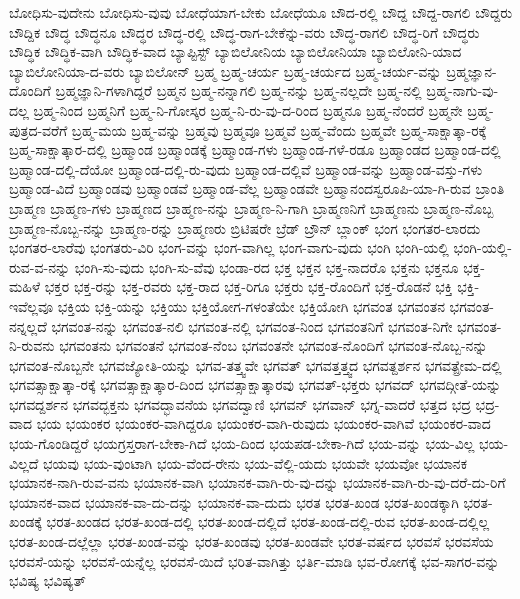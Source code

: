 {ಬೋಧಿಸು-ವುದೇನು
ಬೋಧಿಸು-ವುವು
ಬೋಧೆಯಾಗ-ಬೇಕು
ಬೋಧೆಯೂ
ಬೌದ-ರಲ್ಲಿ
ಬೌದ್ದ
ಬೌದ್ದ-ರಾಗಲಿ
ಬೌದ್ದರು
ಬೌದ್ದಿಕ
ಬೌದ್ಧ
ಬೌದ್ಧನೂ
ಬೌದ್ಧರ
ಬೌದ್ಧ-ರಲ್ಲಿ
ಬೌದ್ಧ-ರಾಗ-ಬೇಕೆನ್ನು-ವರು
ಬೌದ್ಧ-ರಾಗಲಿ
ಬೌದ್ಧ-ರಿಗೆ
ಬೌದ್ಧರು
ಬೌದ್ಧಿಕ
ಬೌದ್ಧಿಕ-ವಾಗಿ
ಬೌದ್ಧಿಕ-ವಾದ
ಬ್ಯಾಪ್ಟಿಸ್ಟ್
ಬ್ಯಾಬಿಲೋನಿಯ
ಬ್ಯಾಬಿಲೋನಿಯಾ
ಬ್ಯಾಬಿಲೋನಿ-ಯಾದ
ಬ್ಯಾಬಿಲೋನಿಯಾ-ದ-ವರು
ಬ್ಯಾಬಿಲೋನ್
ಬ್ರಹ್ಮ
ಬ್ರಹ್ಮ-ಚರ್ಯ
ಬ್ರಹ್ಮ-ಚರ್ಯದ
ಬ್ರಹ್ಮ-ಚರ್ಯ-ವನ್ನು
ಬ್ರಹ್ಮಜ್ಞಾನ-ದೊಂದಿಗೆ
ಬ್ರಹ್ಮಜ್ಞಾನಿ-ಗಳಾಗಿದ್ದರೆ
ಬ್ರಹ್ಮನ
ಬ್ರಹ್ಮ-ನನ್ನಾಗಲಿ
ಬ್ರಹ್ಮ-ನನ್ನು
ಬ್ರಹ್ಮ-ನಲ್ಲದೇ
ಬ್ರಹ್ಮ-ನಲ್ಲಿ
ಬ್ರಹ್ಮ-ನಾಗು-ವು-ದಲ್ಲ
ಬ್ರಹ್ಮ-ನಿಂದ
ಬ್ರಹ್ಮನಿಗೆ
ಬ್ರಹ್ಮ-ನಿ-ಗೋಸ್ಕರ
ಬ್ರಹ್ಮ-ನಿ-ರು-ವು-ದ-ರಿಂದ
ಬ್ರಹ್ಮನೂ
ಬ್ರಹ್ಮ-ನೆಂದರೆ
ಬ್ರಹ್ಮನೇ
ಬ್ರಹ್ಮ-ಪುತ್ರದ-ವರೆಗೆ
ಬ್ರಹ್ಮ-ಮಯ
ಬ್ರಹ್ಮ-ವನ್ನು
ಬ್ರಹ್ಮವು
ಬ್ರಹ್ಮವೂ
ಬ್ರಹ್ಮವೆ
ಬ್ರಹ್ಮ-ವೆಂದು
ಬ್ರಹ್ಮವೇ
ಬ್ರಹ್ಮ-ಸಾಕ್ಷಾತ್ಕಾ-ರಕ್ಕೆ
ಬ್ರಹ್ಮ-ಸಾಕ್ಷಾತ್ಕಾರ-ದಲ್ಲಿ
ಬ್ರಹ್ಮಾಂಡ
ಬ್ರಹ್ಮಾಂಡಕ್ಕೆ
ಬ್ರಹ್ಮಾಂಡ-ಗಳು
ಬ್ರಹ್ಮಾಂಡ-ಗಳೆ-ರಡೂ
ಬ್ರಹ್ಮಾಂಡದ
ಬ್ರಹ್ಮಾಂಡ-ದಲ್ಲಿ
ಬ್ರಹ್ಮಾಂಡ-ದಲ್ಲಿ-ದೆಯೋ
ಬ್ರಹ್ಮಾಂಡ-ದಲ್ಲಿ-ರು-ವುದು
ಬ್ರಹ್ಮಾಂಡ-ದಲ್ಲಿವೆ
ಬ್ರಹ್ಮಾಂಡ-ವನ್ನು
ಬ್ರಹ್ಮಾಂಡ-ವಸ್ತು-ಗಳು
ಬ್ರಹ್ಮಾಂಡ-ವಿದೆ
ಬ್ರಹ್ಮಾಂಡವು
ಬ್ರಹ್ಮಾಂಡವೆ
ಬ್ರಹ್ಮಾಂಡ-ವೆಲ್ಲ
ಬ್ರಹ್ಮಾಂಡವೇ
ಬ್ರಹ್ಮಾನಂದಸ್ವರೂಪಿ-ಯಾ-ಗಿ-ರುವ
ಬ್ರಾಂತಿ
ಬ್ರಾಹ್ಮಣ
ಬ್ರಾಹ್ಮಣ-ಗಳು
ಬ್ರಾಹ್ಮಣದ
ಬ್ರಾಹ್ಮಣ-ನನ್ನು
ಬ್ರಾಹ್ಮಣ-ನಿ-ಗಾಗಿ
ಬ್ರಾಹ್ಮಣನಿಗೆ
ಬ್ರಾಹ್ಮಣನು
ಬ್ರಾಹ್ಮಣ-ನೊಬ್ಬ
ಬ್ರಾಹ್ಮಣ-ನೊಬ್ಬ-ನನ್ನು
ಬ್ರಾಹ್ಮಣ-ರನ್ನು
ಬ್ರಾಹ್ಮಣರು
ಬ್ರಿಟಿಷರೇ
ಬ್ರೆಡ್
ಬ್ರೌನ್
ಬ್ಲಾಂಕ್
ಭಂಗ
ಭಂಗತರ-ಲಾರದು
ಭಂಗತರ-ಲಾರೆವು
ಭಂಗತರು-ವಿರಿ
ಭಂಗ-ವನ್ನು
ಭಂಗ-ವಾಗಿಲ್ಲ
ಭಂಗ-ವಾಗು-ವುದು
ಭಂಗಿ
ಭಂಗಿ-ಯಲ್ಲಿ
ಭಂಗಿ-ಯಲ್ಲಿ-ರುವ-ವ-ನನ್ನು
ಭಂಗಿ-ಸು-ವುದು
ಭಂಗಿ-ಸು-ವೆವು
ಭಂಡಾ-ರದ
ಭಕ್ತ
ಭಕ್ತನ
ಭಕ್ತ-ನಾದರೊ
ಭಕ್ತನು
ಭಕ್ತನೂ
ಭಕ್ತ-ಮಹಿಳೆ
ಭಕ್ತರ
ಭಕ್ತ-ರನ್ನು
ಭಕ್ತ-ರವರು
ಭಕ್ತ-ರಾದ
ಭಕ್ತ-ರಿಗೂ
ಭಕ್ತರು
ಭಕ್ತ-ರೊಂದಿಗೆ
ಭಕ್ತ-ರೊಡನೆ
ಭಕ್ತಿ
ಭಕ್ತಿ-ಇವೆಲ್ಲವೂ
ಭಕ್ತಿಯ
ಭಕ್ತಿ-ಯನ್ನು
ಭಕ್ತಿಯು
ಭಕ್ತಿಯೋಗ-ಗಳಂತೆಯೇ
ಭಕ್ತಿಯೋಗಿ
ಭಗವಂತ
ಭಗವಂತನ
ಭಗವಂತ-ನನ್ನಲ್ಲದೆ
ಭಗವಂತ-ನನ್ನು
ಭಗವಂತ-ನಲಿ
ಭಗವಂತ-ನಲ್ಲಿ
ಭಗವಂತ-ನಿಂದ
ಭಗವಂತನಿಗೆ
ಭಗವಂತ-ನಿಗೇ
ಭಗವಂತ-ನಿ-ರುವನು
ಭಗವಂತನು
ಭಗವಂತನೆ
ಭಗವಂತ-ನೆಂಬ
ಭಗವಂತನೇ
ಭಗವಂತ-ನೊಂದಿಗೆ
ಭಗವಂತ-ನೊಬ್ಬ-ನನ್ನು
ಭಗವಂತ-ನೊಬ್ಬನೇ
ಭಗವಜ್ಯೋತಿ-ಯನ್ನು
ಭಗವ-ತತ್ತ್ವವೇ
ಭಗವತ್
ಭಗವತ್ತತ್ತ್ವದ
ಭಗವತ್ದರ್ಶನ
ಭಗವತ್ಪ್ರೇಮ-ದಲ್ಲಿ
ಭಗವತ್ಸಾಕ್ಷಾತ್ಕಾ-ರಕ್ಕೆ
ಭಗವತ್ಸಾಕ್ಷಾತ್ಕಾರ-ದಿಂದ
ಭಗವತ್ಸಾಕ್ಷಾತ್ಕಾರವು
ಭಗವತ್-ಭಕ್ತರು
ಭಗವದ್
ಭಗವದ್ಗೀತೆ-ಯನ್ನು
ಭಗವದ್ದರ್ಶನ
ಭಗವದ್ಭಕ್ತನು
ಭಗವದ್ಭಾವನೆಯ
ಭಗವದ್ವಾಣಿ
ಭಗವನ್
ಭಗವಾನ್
ಭಗ್ನ-ವಾದರೆ
ಭತ್ತದ
ಭದ್ರ
ಭದ್ರ-ವಾದ
ಭಯ
ಭಯಂಕರ
ಭಯಂಕರ-ವಾಗಿದ್ದರೂ
ಭಯಂಕರ-ವಾಗಿ-ರುವುದು
ಭಯಂಕರ-ವಾಗಿವೆ
ಭಯಂಕರ-ವಾದ
ಭಯ-ಗೊಂಡಿದ್ದರೆ
ಭಯಗ್ರಸ್ತರಾಗ-ಬೇಕಾ-ಗಿದೆ
ಭಯ-ದಿಂದ
ಭಯಪಡ-ಬೇಕಾ-ಗಿದೆ
ಭಯ-ವನ್ನು
ಭಯ-ವಿಲ್ಲ
ಭಯ-ವಿಲ್ಲದೆ
ಭಯವು
ಭಯ-ವುಂಟಾಗಿ
ಭಯ-ವೆಂದ-ರೇನು
ಭಯ-ವೆಲ್ಲಿ-ಯದು
ಭಯವೇ
ಭಯವೋ
ಭಯಾನಕ
ಭಯಾನಕ-ನಾಗಿ-ರುವ-ವನು
ಭಯಾನಕ-ವಾಗಿ
ಭಯಾನಕ-ವಾಗಿ-ರು-ವು-ದನ್ನು
ಭಯಾನಕ-ವಾಗಿ-ರು-ವು-ದರೆ-ದು-ರಿಗೆ
ಭಯಾನಕ-ವಾದ
ಭಯಾನಕ-ವಾ-ದು-ದನ್ನು
ಭಯಾನಕ-ವಾ-ದುದು
ಭರತ
ಭರತ-ಖಂಡ
ಭರತ-ಖಂಡಕ್ಕಾಗಿ
ಭರತ-ಖಂಡಕ್ಕೆ
ಭರತ-ಖಂಡದ
ಭರತ-ಖಂಡ-ದಲ್ಲಿ
ಭರತ-ಖಂಡ-ದಲ್ಲಿದೆ
ಭರತ-ಖಂಡ-ದಲ್ಲಿ-ರುವ
ಭರತ-ಖಂಡ-ದಲ್ಲಿಲ್ಲ
ಭರತ-ಖಂಡ-ದಲ್ಲೆಲ್ಲಾ
ಭರತ-ಖಂಡ-ವನ್ನು
ಭರತ-ಖಂಡವು
ಭರತ-ಖಂಡವೇ
ಭರತ-ವರ್ಷದ
ಭರವಸೆ
ಭರವಸೆಯ
ಭರವಸೆ-ಯನ್ನು
ಭರವಸೆ-ಯನ್ನೆಲ್ಲ
ಭರವಸೆ-ಯಿದೆ
ಭರಿತ-ವಾಗಿತ್ತು
ಭರ್ತಿ-ಮಾಡಿ
ಭವ-ರೋಗಕ್ಕೆ
ಭವ-ಸಾಗರ-ವನ್ನು
ಭವಿಷ್ಯ
ಭವಿಷ್ಯತ್
}
